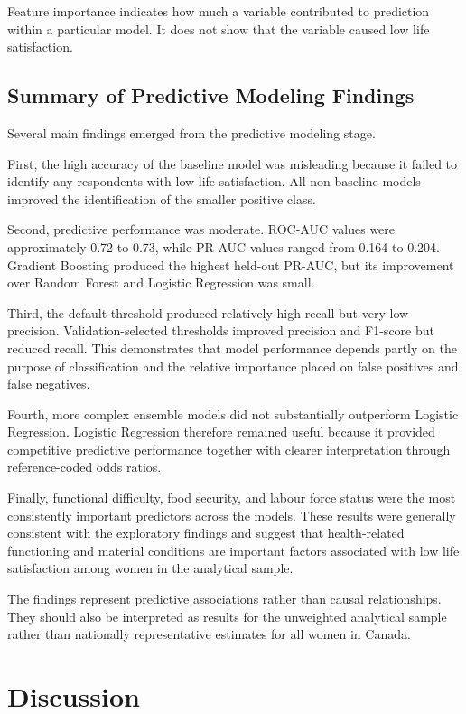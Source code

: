 \documentclass[12pt]{article}
\begin{document}
Feature importance indicates how much a variable contributed to prediction within a particular model. It does not show that the variable caused low life satisfaction.

\subsection{Summary of Predictive Modeling Findings}

Several main findings emerged from the predictive modeling stage.

First, the high accuracy of the baseline model was misleading because it failed to identify any respondents with low life satisfaction. All non-baseline models improved the identification of the smaller positive class.

Second, predictive performance was moderate. ROC-AUC values were approximately 0.72 to 0.73, while PR-AUC values ranged from 0.164 to 0.204. Gradient Boosting produced the highest held-out PR-AUC, but its improvement over Random Forest and Logistic Regression was small.

Third, the default threshold produced relatively high recall but very low precision. Validation-selected thresholds improved precision and F1-score but reduced recall. This demonstrates that model performance depends partly on the purpose of classification and the relative importance placed on false positives and false negatives.

Fourth, more complex ensemble models did not substantially outperform Logistic Regression. Logistic Regression therefore remained useful because it provided competitive predictive performance together with clearer interpretation through reference-coded odds ratios.

Finally, functional difficulty, food security, and labour force status were the most consistently important predictors across the models. These results were generally consistent with the exploratory findings and suggest that health-related functioning and material conditions are important factors associated with low life satisfaction among women in the analytical sample.

The findings represent predictive associations rather than causal relationships. They should also be interpreted as results for the unweighted analytical sample rather than nationally representative estimates for all women in Canada.

\section{Discussion}
\end{document}
